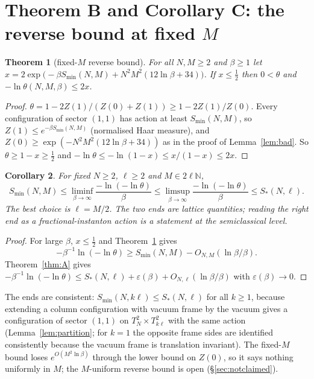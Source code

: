 \documentclass[11pt,a4paper]{article}
\newtheorem{theorem}{Theorem}
\newtheorem{corollary}[theorem]{Corollary}
\theoremstyle{definition}
\theoremstyle{remark}
\begin{document}
\section{Theorem B and Corollary C: the reverse bound at fixed $M$}\label{sec:B}

\begin{theorem}[fixed-$M$ reverse bound]\label{thm:B}
For all $N,M\ge2$ and $\beta\ge1$ let $x=2\exp\big(-\beta S_{\min}(N,M)+N^2M^2(12\ln\beta+34)\big)$. If $x\le\frac12$ then $0<\theta$ and $-\ln\theta(N,M,\beta)\le2x$.
\end{theorem}
\begin{proof}
$\theta=1-2Z(1)/(Z(0)+Z(1))\ge1-2Z(1)/Z(0)$. Every configuration of sector $(1,1)$ has action at least $S_{\min}(N,M)$, so $Z(1)\le e^{-\beta S_{\min}(N,M)}$ (normalised Haar measure), and $Z(0)\ge\exp(-N^2M^2(12\ln\beta+34))$ as in the proof of Lemma~\ref{lem:bad}. So $\theta\ge1-x\ge\frac12$ and $-\ln\theta\le-\ln(1-x)\le x/(1-x)\le2x$.
\end{proof}

\begin{corollary}\label{cor:C}
For fixed $N\ge2$, $\ell\ge2$ and $M\in2\ell\mathbb{N}$,
\[ S_{\min}(N,M)\le\liminf_{\beta\to\infty}\frac{-\ln(-\ln\theta)}{\beta}\le\limsup_{\beta\to\infty}\frac{-\ln(-\ln\theta)}{\beta}\le S_*(N,\ell). \]
The best choice is $\ell=M/2$. The two ends are lattice quantities; reading the right end as a fractional-instanton action is a statement at the semiclassical level.
\end{corollary}
\begin{proof}
For large $\beta$, $x\le\frac12$ and Theorem~\ref{thm:B} gives
\[ -\beta^{-1}\ln(-\ln\theta)\ge S_{\min}(N,M)-O_{N,M}(\ln\beta/\beta). \] Theorem~\ref{thm:A} gives $-\beta^{-1}\ln(-\ln\theta)\le S_*(N,\ell)+\varepsilon(\beta)+O_{N,\ell}(\ln\beta/\beta)$ with $\varepsilon(\beta)\to0$.
\end{proof}

The ends are consistent: $S_{\min}(N,k\ell)\le S_*(N,\ell)$ for all $k\ge1$, because extending a column configuration with vacuum frame by the vacuum gives a configuration of sector $(1,1)$ on $T^2_N\times T^2_{k\ell}$ with the same action (Lemma~\ref{lem:partition}; for $k=1$ the opposite frame sides are identified consistently because the vacuum frame is translation invariant).
The fixed-$M$ bound loses $e^{O(M^2\ln\beta)}$ through the lower bound on $Z(0)$, so it says nothing uniformly in $M$; the $M$-uniform reverse bound is open (\S\ref{sec:notclaimed}).
\end{document}

